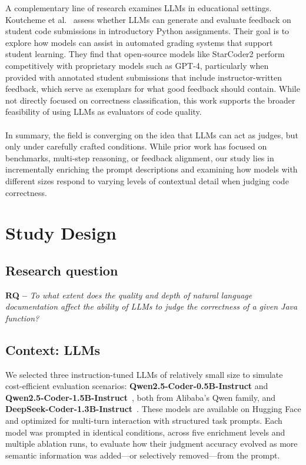 \documentclass[a4paper]{usiinfbachelorproject}
\begin{document}
A complementary line of research examines LLMs in educational settings. Koutcheme et al.~\cite{koutcheme2025evaluating} assess whether LLMs can generate and evaluate feedback on student code submissions in introductory Python assignments. Their goal is to explore how models can assist in automated grading systems that support student learning. They find that open-source models like StarCoder2 perform competitively with proprietary models such as GPT-4, particularly when provided with annotated student submissions that include instructor-written feedback, which serve as exemplars for what good feedback should contain. While not directly focused on correctness classification, this work supports the broader feasibility of using LLMs as evaluators of code quality.\\
\\[2pt]
In summary, the field is converging on the idea that LLMs can act as judges, but only under carefully crafted conditions. While prior work has focused on benchmarks, multi-step reasoning, or feedback alignment, our study lies in incrementally enriching the prompt descriptions and examining how models with different sizes respond to varying levels of contextual detail when judging code correctness.

\section{Study Design}\label{sec:design}

\subsection*{Research question}
\noindent\textbf{RQ –} \emph{To what extent does the quality and depth of natural language documentation affect the ability of LLMs to judge the correctness of a given Java function?}

\subsection{Context: LLMs}\label{sec:llms}
We selected three instruction-tuned LLMs of relatively small size to simulate cost-efficient evaluation scenarios: \textbf{Qwen2.5-Coder-0.5B-Instruct} and \textbf{Qwen2.5-Coder-1.5B-Instruct}~\cite{qwen2024repo}, both from Alibaba’s Qwen family, and \textbf{DeepSeek-Coder-1.3B-Instruct}~\cite{deepseek2024repo}. These models are available on Hugging Face and optimized for multi-turn interaction with structured task prompts. Each model was prompted in identical conditions, across five enrichment levels and multiple ablation runs, to evaluate how their judgment accuracy evolved as more semantic information was added—or selectively removed—from the prompt.
\end{document}
